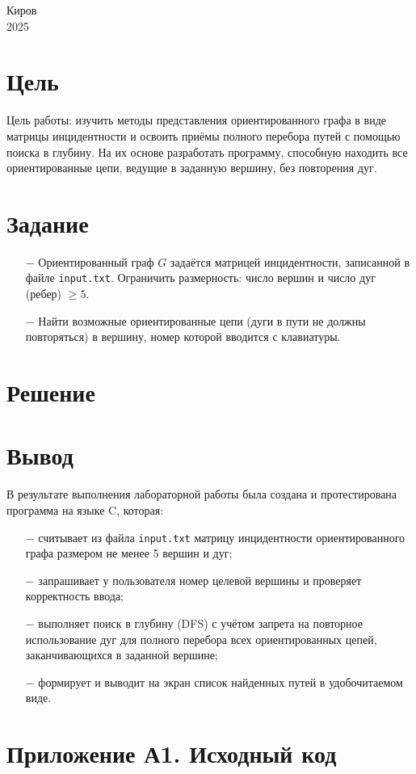\documentclass[oneside,a4paper,14pt]{extarticle}
\begin{document}
\begin{center}
	Киров\\
	2025
\end{center}

\newpage\thispagestyle{plain}

\section*{Цель}

Цель работы: изучить методы представления ориентированного графа в виде матрицы инцидентности и освоить приёмы полного перебора путей с помощью поиска в глубину. На их основе разработать программу, способную находить все ориентированные цепи, ведущие в заданную вершину, без повторения дуг.
\section*{Задание}
\begin{itemize}
	\item[$-$] Ориентированный граф \(G\) задаётся матрицей инцидентности, записанной в файле \texttt{input.txt}. Ограничить размерность: число вершин и число дуг (ребер) \(\ge 5\).
	\item[$-$] Найти возможные ориентированные цепи (дуги в пути не должны повторяться) в вершину, номер которой вводится с клавиатуры.
\end{itemize}

\section*{Решение}


\clearpage

\section*{Вывод}

В результате выполнения лабораторной работы была создана и протестирована программа на языке C, которая:

\begin{itemize}
    \item[$-$] считывает из файла \texttt{input.txt} матрицу инцидентности ориентированного графа размером не менее 5 вершин и дуг;
    \item[$-$] запрашивает у пользователя номер целевой вершины и проверяет корректность ввода;
    \item[$-$] выполняет поиск в глубину (DFS) с учётом запрета на повторное использование дуг для полного перебора всех ориентированных цепей, заканчивающихся в заданной вершине;
    \item[$-$] формирует и выводит на экран список найденных путей в удобочитаемом виде.
\end{itemize}


\clearpage
\section*{Приложение А1. Исходный код}
\end{document}
